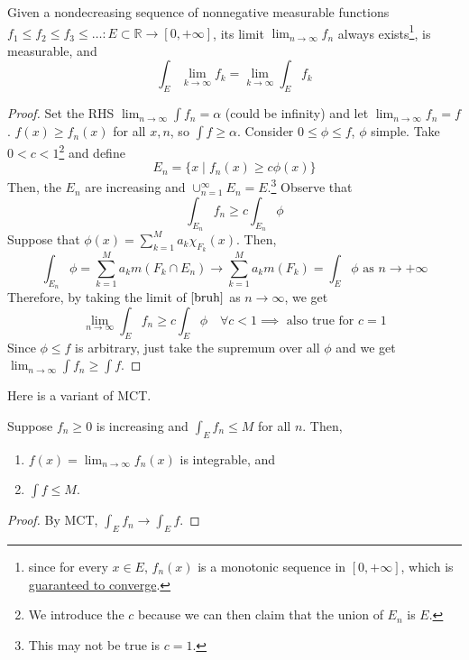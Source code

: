   \begin{theorem}
    Given a nondecreasing sequence of nonnegative measurable functions $f_1 \leq f_2 \leq f_3 \leq \ldots : E \subset \mathbb{R} \longrightarrow [0, +\infty]$, its limit $\lim_{n \rightarrow \infty} f_n$ always exists\footnote{since for every $x \in E$, $f_n(x)$ is a monotonic sequence in $[0, +\infty]$, which is \hyperref[real-thm:monotone-convergence]{guaranteed to converge}.}, is measurable, and 
    \begin{equation}
      \int_E \lim_{k \rightarrow \infty} f_k = \lim_{k \rightarrow \infty} \int_E f_k
    \end{equation}
  \end{theorem}
  \begin{proof}
    Set the RHS $\lim_{n \to \infty} \int f_n = \alpha$ (could be infinity) and let $\lim_{n \to \infty} f_n = f$. $f(x) \geq f_n (x)$ for all $x, n$, so $\int f \geq \alpha$. Consider $0 \leq \phi \leq f$, $\phi$ simple. Take $0 < c < 1$\footnote{We introduce the $c$ because we can then claim that the union of $E_n$ is $E$.} and define 
    \begin{equation}
      E_n = \{ x \mid f_n (x) \geq c \phi(x) \} 
    \end{equation} 
    Then, the $E_n$ are increasing and $\cup_{n=1}^\infty E_n = E$.\footnote{This may not be true is $c = 1$.} Observe that 
    \begin{equation}
      \label{bruh}
      \int_{E_n} f_n \geq c \int_{E_n} \phi  
    \end{equation}
    Suppose that $\phi (x) = \sum_{k=1}^M a_k \chi_{F_k} (x)$. Then, 
    \begin{equation}
      \int_{E_n} \phi = \sum_{k=1}^M a_k m(F_k \cap E_n) \to \sum_{k=1}^M a_k m(F_k) = \int_E \phi \text{ as } n \to +\infty
    \end{equation} 
    Therefore, by taking the limit of $\ref{bruh}$ as $n \to \infty$, we get 
    \begin{equation}
      \lim_{n \to \infty} \int_E f_n \geq c \int_E \phi \quad \forall c < 1 \implies \text{ also true for } c = 1
    \end{equation}
    Since $\phi \leq f$ is arbitrary, just take the supremum over all $\phi$ and we get $\lim_{n \to \infty} \int f_n \geq \int f $. 
  \end{proof}

  Here is a variant of MCT. 

  \begin{lemma} 
    Suppose $f_n \geq 0$ is increasing and $\int_E f_n \leq M$ for all $n$. Then, 
    \begin{enumerate}
      \item $f(x) = \lim_{n \to \infty} f_n (x)$ is integrable, and 
      \item $\int f \leq M$. 
    \end{enumerate}
  \end{lemma}
  \begin{proof}
    By MCT, $\int_E f_n \to \int_E f$. 
  \end{proof} 

